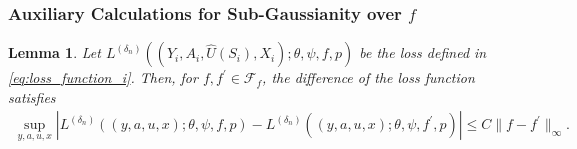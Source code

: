 \documentclass[12pt]{article}
\newtheorem{lemma}{Lemma}%
\begin{document}
\subsubsection{Auxiliary Calculations for Sub-Gaussianity over $f$}

\begin{lemma}\label{lemma:L_i_diff_f}
    Let $L^{(\delta_n)}((Y_i,A_i,\widehat U(S_i),X_i);\theta,\psi,f,p)$ be the loss defined in \eqref{eq:loss_function_i}. Then, for $f,f^\prime\in\mathcal{F}_f$, the difference of the loss function satisfies
    \begin{align*}
        \sup_{y,a,u,x}\left|L^{(\delta_n)}((y,a,u,x);\theta,\psi,f,p) - L^{(\delta_n)}((y,a,u,x);\theta,\psi,f^\prime,p)\right| \leq C\|f-f^\prime\|_\infty.
    \end{align*}
\end{lemma}
\end{document}
